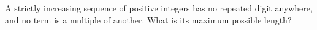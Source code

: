 A strictly increasing sequence of positive integers has no repeated digit anywhere, and no term is a multiple of another. What is its maximum possible length?
